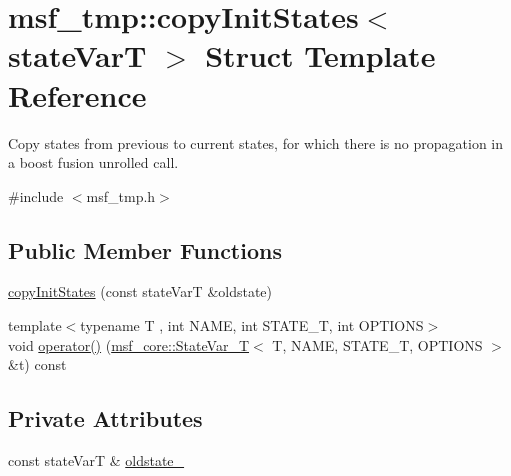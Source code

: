 \hypertarget{structmsf__tmp_1_1copyInitStates}{\section{msf\-\_\-tmp\-:\-:copy\-Init\-States$<$ state\-Var\-T $>$ Struct Template Reference}
\label{structmsf__tmp_1_1copyInitStates}
}


Copy states from previous to current states, for which there is no propagation in a boost fusion unrolled call.  




{\ttfamily \#include $<$msf\-\_\-tmp.\-h$>$}

\subsection*{Public Member Functions}
\begin{DoxyCompactItemize}
\item 
\hyperlink{structmsf__tmp_1_1copyInitStates_af92f81a9c012c7171719098aed0e3ce7}{copy\-Init\-States} (const state\-Var\-T \&oldstate)
\item 
{\footnotesize template$<$typename T , int N\-A\-M\-E, int S\-T\-A\-T\-E\-\_\-\-T, int O\-P\-T\-I\-O\-N\-S$>$ }\\void \hyperlink{structmsf__tmp_1_1copyInitStates_a1c86ddde81da9535c1b19f19fff77ff3}{operator()} (\hyperlink{structmsf__core_1_1StateVar__T}{msf\-\_\-core\-::\-State\-Var\-\_\-\-T}$<$ T, N\-A\-M\-E, S\-T\-A\-T\-E\-\_\-\-T, O\-P\-T\-I\-O\-N\-S $>$ \&t) const 
\end{DoxyCompactItemize}
\subsection*{Private Attributes}
\begin{DoxyCompactItemize}
\item 
const state\-Var\-T \& \hyperlink{structmsf__tmp_1_1copyInitStates_a408292aa7f46627750a4232abdb8559d}{oldstate\-\_\-}
\end{DoxyCompactItemize}


